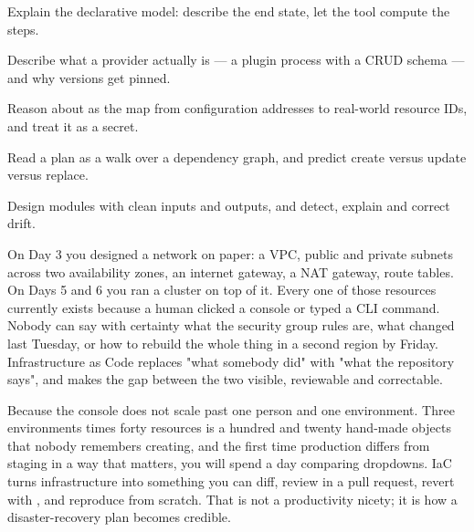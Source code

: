 
\begin{objectives}
\begin{wbitem}
  \item Explain the declarative model: describe the end state, let the tool compute the steps.
  \item Describe what a provider actually is --- a plugin process with a CRUD schema --- and why versions get pinned.
  \item Reason about  as the map from configuration addresses to real-world resource IDs, and treat it as a secret.
  \item Read a plan as a walk over a dependency graph, and predict create versus update versus replace.
  \item Design modules with clean inputs and outputs, and detect, explain and correct drift.
\end{wbitem}
\end{objectives}


 On Day 3 you designed a network on paper: a VPC, public and private subnets across two availability zones, an internet gateway, a NAT gateway, route tables. On Days 5 and 6 you ran a cluster on top of it. Every one of those resources currently exists because a human clicked a console or typed a CLI command. Nobody can say with certainty what the security group rules are, what changed last Tuesday, or how to rebuild the whole thing in a second region by Friday. Infrastructure as Code replaces "what somebody did" with "what the repository says", and makes the gap between the two visible, reviewable and correctable.

 Because the console does not scale past one person and one environment. Three environments times forty resources is a hundred and twenty hand-made objects that nobody remembers creating, and the first time production differs from staging in a way that matters, you will spend a day comparing dropdowns. IaC turns infrastructure into something you can diff, review in a pull request, revert with , and reproduce from scratch. That is not a productivity nicety; it is how a disaster-recovery plan becomes credible.


